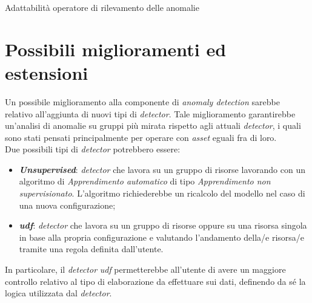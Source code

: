 \begin{risk}{Adattabilità operatore di rilevamento delle anomalie}
    \label{risk:anomalyDetector} 
\end{risk}

\section{Possibili miglioramenti ed estensioni}
Un possibile miglioramento alla componente di \textit{anomaly detection} sarebbe relativo all'aggiunta di nuovi tipi di \textit{detector}. Tale miglioramento garantirebbe un'analisi di anomalie su gruppi più mirata rispetto agli attuali \textit{detector}, i quali sono stati pensati principalmente per operare con \textit{asset} eguali fra di loro.\\
Due possibili tipi di \textit{detector} potrebbero essere:
\begin{itemize}
	\item{\textbf{\textit{Unsupervised}}: \textit{detector} che lavora su un gruppo di risorse lavorando con un algoritmo di \textit{\gls{Apprendimento automatico}} di tipo \textit{\gls{Apprendimento non supervisionato}}. L'algoritmo richiederebbe un ricalcolo del modello nel caso di una nuova configurazione;}
	\item{\textbf{\textit{\gls{udf}}}: \textit{detector} che lavora su un gruppo di risorse oppure su una risorsa singola in base alla propria configurazione e valutando l'andamento della/e risorsa/e tramite una regola definita dall'utente.}
\end{itemize}
In particolare, il \textit{detector} \textit{\gls{udf}} permetterebbe all'utente di avere un maggiore controllo relativo al tipo di elaborazione da effettuare sui dati, definendo da sé la logica utilizzata dal \textit{detector}.



